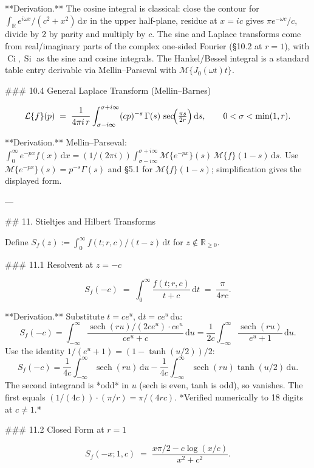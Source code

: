 **Derivation.** The cosine integral is classical: close the contour for $\int_{\mathbb R}e^{i\omega x}/(c^{2}+x^{2})\,\mathrm dx$ in the upper half-plane, residue at $x=ic$ gives $\pi e^{-\omega c}/c$, divide by 2 by parity and multiply by $c$. The sine and Laplace transforms come from real/imaginary parts of the complex one-sided Fourier (§10.2 at $r=1$), with $\operatorname{Ci}, \operatorname{Si}$ as the sine and cosine integrals. The Hankel/Bessel integral is a standard table entry derivable via Mellin–Parseval with $\mathcal M\{J_{0}(\omega t)t\}$.

### 10.4 General Laplace Transform (Mellin–Barnes)

$$
\mathcal L\{f\}(p) \;=\; \frac{1}{4\pi i\,r}\int_{\sigma-i\infty}^{\sigma+i\infty}(cp)^{-s}\,\Gamma(s)\,\sec\!\Bigl(\tfrac{\pi s}{2r}\Bigr)\,\mathrm ds,\qquad 0<\sigma<\min(1,r).
$$

**Derivation.** Mellin–Parseval: $\int_{0}^{\infty}e^{-px}f(x)\,\mathrm dx = (1/(2\pi i))\int_{\sigma-i\infty}^{\sigma+i\infty}\mathcal M\{e^{-px}\}(s)\,\mathcal M\{f\}(1-s)\,\mathrm ds$. Use $\mathcal M\{e^{-px}\}(s) = p^{-s}\Gamma(s)$ and §5.1 for $\mathcal M\{f\}(1-s)$; simplification gives the displayed form.

---

## 11. Stieltjes and Hilbert Transforms

Define $S_{f}(z) := \int_{0}^{\infty}f(t;r,c)/(t-z)\,\mathrm dt$ for $z\notin\mathbb R_{\ge 0}$.

### 11.1 Resolvent at $z=-c$

$$
\boxed{\;S_{f}(-c) \;=\; \int_{0}^{\infty}\frac{f(t;r,c)}{t+c}\,\mathrm dt \;=\; \frac{\pi}{4rc}.\;}
$$

**Derivation.** Substitute $t = ce^{u}$, $\mathrm dt = ce^{u}\,\mathrm du$:
$$
S_{f}(-c) = \int_{-\infty}^{\infty}\frac{\operatorname{sech}(ru)/(2ce^{u})\cdot ce^{u}}{ce^{u}+c}\,\mathrm du = \frac{1}{2c}\int_{-\infty}^{\infty}\frac{\operatorname{sech}(ru)}{e^{u}+1}\,\mathrm du.
$$
Use the identity $1/(e^{u}+1) = (1-\tanh(u/2))/2$:
$$
S_{f}(-c) = \frac{1}{4c}\int_{-\infty}^{\infty}\operatorname{sech}(ru)\,\mathrm du - \frac{1}{4c}\int_{-\infty}^{\infty}\operatorname{sech}(ru)\tanh(u/2)\,\mathrm du.
$$
The second integrand is *odd* in $u$ (sech is even, tanh is odd), so vanishes. The first equals $(1/(4c))\cdot(\pi/r) = \pi/(4rc)$. *Verified numerically to 18 digits at $c\ne 1$.*

### 11.2 Closed Form at $r=1$

$$
S_{f}(-x;1,c) \;=\; \frac{x\pi/2 - c\log(x/c)}{x^{2}+c^{2}}.
$$


